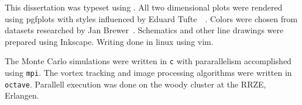 This dissertation was typeset using . All
two dimensional plots were rendered using pgfplots with styles influenced by
Eduard Tufte~\cite{tufte1983visual}~\cite{tufte1983visual}. Colors were chosen
from datasets researched by Jan Brewer~\cite{harrower2003colorbrewer}.
Schematics and other line drawings were prepared using Inkscape. Writing done
in linux using vim.

The Monte Carlo simulations were written in \texttt{c} with pararallelism
accomplished using \texttt{mpi}. The vortex tracking and image processing
algorithms were written in \texttt{octave}. Parallell execution was done on the
woody cluster at the RRZE, Erlangen. 
